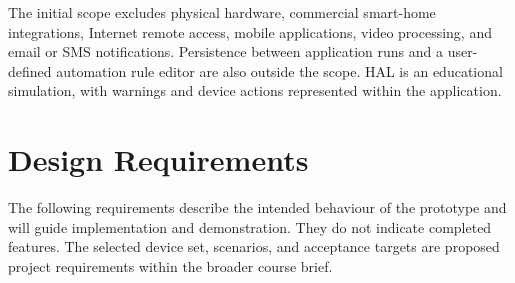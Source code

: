 \documentclass[12pt,letterpaper]{report}
\begin{document}
The initial scope excludes physical hardware, commercial smart-home integrations, Internet remote access, mobile applications, video processing, and email or SMS notifications. Persistence between application runs and a user-defined automation rule editor are also outside the scope. HAL is an educational simulation, with warnings and device actions represented within the application.

\section{Design Requirements}
The following requirements describe the intended behaviour of the prototype and will guide implementation and demonstration. They do not indicate completed features. The selected device set, scenarios, and acceptance targets are proposed project requirements within the broader course brief.
\end{document}
